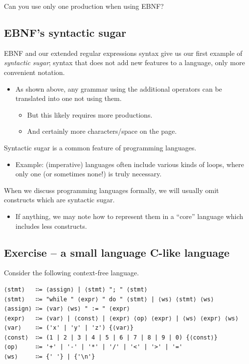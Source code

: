 \documentclass[11pt]{article}
\theoremstyle{definition}
\begin{document}
Can you use only one production when using EBNF?

\subsection{EBNF's syntactic sugar}
\label{sec:orge66946e}
EBNF and our extended regular expressions syntax
give us our first example of \emph{syntactic sugar};
syntax that does not add new features to a language,
only more convenient notation.
\begin{itemize}
\item As shown above, any grammar using the additional operators
can be translated into one not using them.
\begin{itemize}
\item But this likely requires more productions.
\item And certainly more characters/space on the page.
\end{itemize}
\end{itemize}

Syntactic sugar is a common feature of programming languages.
\begin{itemize}
\item Example: (imperative) languages often include various kinds of loops,
where only one (or sometimes none!) is truly necessary.
\end{itemize}

When we discuss programming languages formally,
we will usually omit constructs which are syntactic sugar.
\begin{itemize}
\item If anything, we may note how to represent them
in a “core” language which includes less constructs.
\end{itemize}

\subsection{Exercise – a small language C-like language}
\label{sec:org9cf9f20}
Consider the following context-free language.
\begin{verbatim}
⟨stmt⟩   ∷= ⟨assign⟩ | ⟨stmt⟩ "; " ⟨stmt⟩
⟨stmt⟩   ∷= "while " ⟨expr⟩ " do " ⟨stmt⟩ | ⟨ws⟩ ⟨stmt⟩ ⟨ws⟩
⟨assign⟩ ∷= ⟨var⟩ ⟨ws⟩ " := " ⟨expr⟩
⟨expr⟩   ∷= ⟨var⟩ | ⟨const⟩ | ⟨expr⟩ ⟨op⟩ ⟨expr⟩ | ⟨ws⟩ ⟨expr⟩ ⟨ws⟩
⟨var⟩    ∷= ('x' | 'y' | 'z') {⟨var⟩}
⟨const⟩  ∷= (1 | 2 | 3 | 4 | 5 | 6 | 7 | 8 | 9 | 0) {⟨const⟩}
⟨op⟩     ∷= '+' | '-' | '*' | '/' | '<' | '>' | '='
⟨ws⟩     ∷= {' '} | {'\n'}
\end{verbatim}
\end{document}
